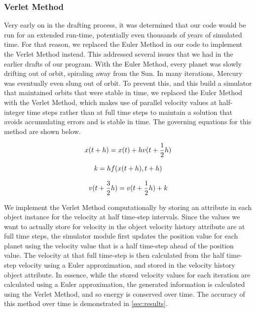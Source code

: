 \documentclass[a4paper,12pt]{article} %
\numberwithin{equation}{section} %
\numberwithin{figure}{section} %
\begin{document}
\subsubsection{Verlet Method}
Very early on in the drafting process, it was determined that our code would be run for an extended run-time, potentially even thousands of years of simulated time. For that reason, we replaced the Euler Method in our code to implement the Verlet Method instead. This addressed several issues that we had in the earlier drafts of our program. With the Euler Method, every planet was slowly drifting out of orbit, spiraling away from the Sun. In many iterations, Mercury was eventually even slung out of orbit. To prevent this, and this build a simulator that maintained orbits that were stable in time, we replaced the Euler Method with the Verlet Method, which makes use of parallel velocity values at half-integer time steps rather than at full time steps to maintain a solution that avoids accumulating errors and is stable in time. The governing equations for this method are shown below.

\begin{equation}
\centering
x(t+h)=x(t)+hv(t+\frac{1}{2}h)
\end{equation}

\begin{equation}
\centering
k=hf(x(t+h),t+h)
\end{equation}

\begin{equation}
\centering
v(t+\frac{3}{2}h)=v(t+\frac{1}{2}h) + k
\end{equation}

We implement the Verlet Method computationally by storing an attribute in each object instance for the velocity at half time-step intervals. Since the values we want to actually store for velocity in the object velocity history attribute are at full time steps, the simulator module first updates the position value for each planet using the velocity value that is a half time-step ahead of the position value. The velocity at that full time-step is then calculated from the half time-step velocity using a Euler approximation, and stored in the velocity history object attribute. In essence, while the stored velocity values for each iteration are calculated using a Euler approximation, the generated information is calculated using the Verlet Method, and so energy is conserved over time. The accuracy of this method over time is demonstrated in \autoref{sec:results}.
\end{document}
